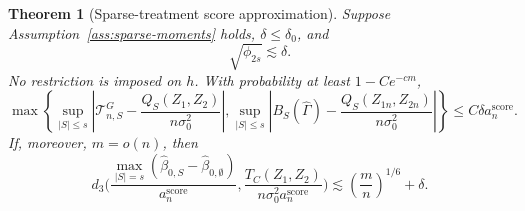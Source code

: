 \documentclass[a4paper,11pt,english]{article}
\newtheorem{theorem}{Theorem}[section]
\begin{document}
\begin{theorem}[Sparse-treatment score approximation]
\label{thm:chaos-degeneration}
Suppose Assumption~\ref{ass:sparse-moments} holds, $\delta\le\delta_0$, and
\begin{equation}\label{eq:local-treatment}
        \sqrt{\phi_{2s}}\lesssim\delta.
\end{equation}
No restriction is imposed on $h$.  With probability at least
$1-Ce^{-cm}$,
\begin{equation}\label{eq:score-reduction}
\max\left\{
\sup_{|S|\le s}\left|
        \mathcal T^G_{n,S}
        -\frac{Q_S(Z_1,Z_2)}{n\sigma_0^2}\right|,
\sup_{|S|\le s}\left|
        B_S(\hat\Gamma)
        -\frac{Q_S(Z_{1n},Z_{2n})}{n\sigma_0^2}\right|
\right\}
\le C\delta a_n^{\mathrm{score}}.
\end{equation}
If, moreover, $m=o(n)$, then
\begin{equation}\label{eq:local-treatment-stochastic-approximation}
        d_3\bigg(
        \frac{\max_{|S|=s}
        (\hat\beta_{0,S}-\hat\beta_{0,\emptyset})}
        {a_n^{\mathrm{score}}},
        \frac{T_C(Z_1,Z_2)}
        {n\sigma_0^2a_n^{\mathrm{score}}}
        \bigg)
        \lesssim
        \left(\frac{m}{n}\right)^{1/6}+\delta.
\end{equation}
\end{theorem}
\end{document}
